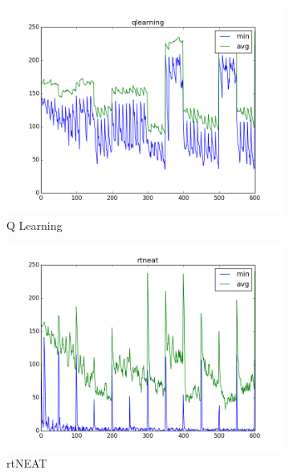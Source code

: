 \documentclass[letterpaper]{article}
\begin{document}
\begin{figure}[ht]
\centering
\begin{subfigure}{0.7\columnwidth}
  \centering
  \includegraphics[width=\columnwidth]{moving_qlearning.png}
  \caption{Q Learning}
  \label{fig:moving_q}
\end{subfigure}%
\begin{subfigure}{0.7\columnwidth}
  \centering
  \includegraphics[width=\columnwidth]{moving_rtneat.png}
  \caption{rtNEAT}
  \label{fig:moving_neat}
\end{subfigure}
\begin{subfigure}{0.7\columnwidth}
  \centering

\end{subfigure}
\end{figure}
\end{document}
